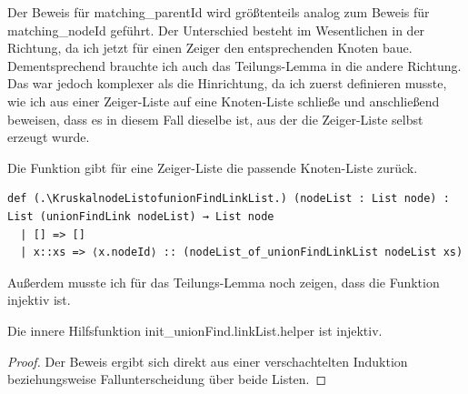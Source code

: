 Der Beweis für matching\_parentId wird größtenteils analog zum Beweis für mat\-ching\_nodeId geführt.
Der Unterschied besteht im Wesentlichen in der Richtung, da ich jetzt für einen Zeiger den entsprechenden Knoten baue.
Dementsprechend brauchte ich auch das Teilungs-Lemma in die andere Richtung.
Das war jedoch komplexer als die Hinrichtung, da ich zuerst definieren musste, wie ich aus einer Zeiger-Liste auf eine Knoten-Liste schließe
und anschließend beweisen, dass es in diesem Fall dieselbe ist, aus der die Zeiger-Liste selbst erzeugt wurde.

\begin{definition}[\KruskalnodeListofunionFindLinkList]\label{KruskalnodeListofunionFindLinkList}
  Die Funktion gibt für eine Zeiger-Liste die passende Knoten-Liste zurück.
\end{definition}
\begin{lstlisting}
def (.\KruskalnodeListofunionFindLinkList.) (nodeList : List node) : List (unionFindLink nodeList) → List node
  | [] => []
  | x::xs => ⟨x.nodeId⟩ :: (nodeList_of_unionFindLinkList nodeList xs)
\end{lstlisting}

Außerdem musste ich für das Teilungs-Lemma noch zeigen, dass die Funktion injektiv ist.

\begin{lemma}[\KruskalinitunionFindlinkListhelperinjectiv]
  Die innere Hilfsfunktion init\_unionFind.linkList.helper ist injektiv.
\end{lemma}
\begin{proof}
  Der Beweis ergibt sich direkt aus einer verschachtelten Induktion beziehungsweise Fallunterscheidung über beide Listen.
\end{proof}

